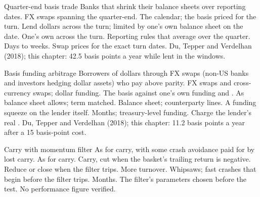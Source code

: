 \begin{strategyfile}{Quarter-end basis trade}\label{strat:s2:cross-currency-basis-and-fx-carry:qe}
 Banks that shrink their balance sheets over reporting dates.
 FX swaps spanning the quarter-end.
 The calendar; the basis priced for the turn.
 Lend dollars across the turn; limited by one's own balance sheet on the date.
 One's own  across the turn.
 Reporting rules that average over the quarter.
 Days to weeks.
 Swap prices for the exact turn dates.
 Du, Tepper and Verdelhan (2018); this chapter: 42.5 basis points a year while lent in the windows.
\end{strategyfile}

\begin{strategyfile}{Basis funding arbitrage}\label{strat:s2:cross-currency-basis-and-fx-carry:funding}
 Borrowers of dollars through FX swaps (non-US banks and investors hedging dollar assets) who pay above parity.
 FX swaps and cross-currency swaps; dollar funding.
 The basis against one's own funding and .
 As balance sheet allows; term matched.
 Balance sheet; counterparty lines.
 A funding squeeze on the lender itself.
 Months; treasury-level funding.
 Charge the lender's real .
 Du, Tepper and Verdelhan (2018); this chapter: 11.2 basis points a year after a 15 basis-point cost.
\end{strategyfile}

\begin{strategyfile}{Carry with momentum filter}\label{strat:s2:cross-currency-basis-and-fx-carry:momentum}
 As for carry, with some crash avoidance paid for by lost carry.
 As for carry.
 Carry, cut when the basket's trailing return is negative.
 Reduce or close when the filter trips.
 More turnover.
 Whipsaws; fast crashes that begin before the filter trips.
 Months.
 The filter's parameters chosen before the test.
 No performance figure verified.
\end{strategyfile}


